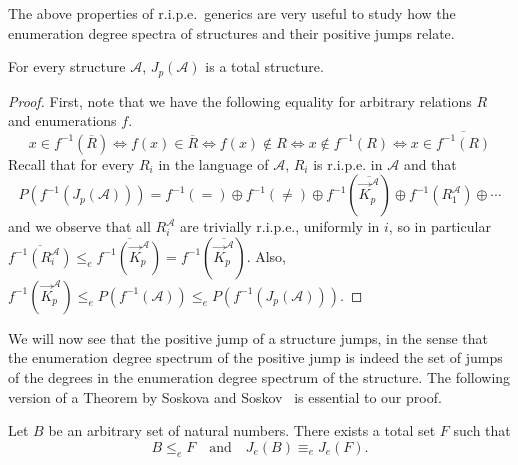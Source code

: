 \documentclass[11pt]{amsart}
\newcommand{\A}{{\mathcal{A}}}
\newcommand{\B}{{\mathcal{B}}}
\renewcommand{\bar}[1]{\overline{#1}}
\begin{document}
The above properties of r.i.p.e.\ generics are very useful to study how the enumeration degree spectra of structures and their positive jumps relate.

\begin{proposition}
For every structure $\A$, $J_p(\A)$ is a total structure.
\end{proposition}
\begin{proof}
    First, note that we have the following equality for arbitrary relations $R$ and enumerations $f$.
    \[ x\in f^{-1}(\bar R) \Leftrightarrow f(x)\in \bar R \Leftrightarrow f(x)\not\in R \Leftrightarrow x\not\in f^{-1}(R)\Leftrightarrow x\in \bar{f^{-1}(R)}\]
    Recall that for every $R_i$ in the language of $\A$, $R_i$ is r.i.p.e. in $\A$ and that 
    \[ P(f^{-1}(J_p(\A))) = f^{-1}(=) \oplus f^{-1}(\neq) \oplus f^{-1}(\overline{\vec K^{\A}_p}) \oplus f^{-1}(R^\A_1) \oplus \cdots\]
    and we observe that all $R_i^\A$ are trivially r.i.p.e., uniformly in $i$, so in particular $\overline{f^{-1}(R_i^\A)} \leq_e \overline{f^{-1}(\vec K^\A_p)}=f^{-1}(\bar{\vec K^\A_p})$. Also, $f^{-1}(\vec K^\A_p)\leq_e P(f^{-1}(\A))\leq_e P(f^{-1}(J_p(\A)))$.
\end{proof}
We will now see that the positive jump of a structure jumps, in the sense that the enumeration degree spectrum of the positive jump is indeed the set of jumps of the degrees in the enumeration degree spectrum of the structure. The following version of a Theorem by Soskova and Soskov~\cite{soskova2009} is essential to our proof.
\begin{thm}\label{Soskov}
    Let $B$ be an arbitrary set of natural numbers. There exists a total set $F$ such that
    \begin{equation*}
        B \leq_e F \quad \text{and} \quad J_e(B) \equiv_e J_e(F).
    \end{equation*}
\end{thm}
\end{document}
